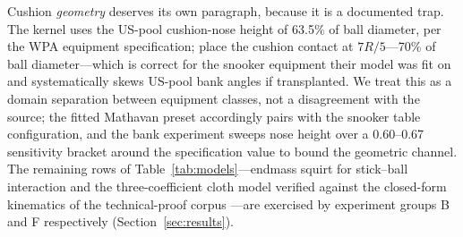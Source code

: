 Cushion \emph{geometry} deserves its own paragraph, because it is a
documented trap. The kernel uses the US-pool cushion-nose height of
63.5\% of ball diameter, per the WPA equipment specification;
\citet{mathavan2010cushion} place the cushion contact at $7R/5$---70\% of
ball diameter---which is correct for the snooker equipment their model was
fit on and systematically skews US-pool bank angles if transplanted. We
treat this as a domain separation between equipment classes, not a
disagreement with the source; the fitted Mathavan preset accordingly pairs
with the snooker table configuration, and the bank experiment sweeps nose
height over a 0.60--0.67 sensitivity bracket around the specification
value to bound the geometric channel. The remaining rows of
Table~\ref{tab:models}---endmass squirt for stick--ball interaction
\citep{cross2008squirt,alciatore_tp_a31,shepard2001squirt} and the
three-coefficient cloth model verified against the closed-form kinematics
of the technical-proof corpus \citep{alciatore_tp_catalog}---are exercised
by experiment groups B and F respectively (Section~\ref{sec:results}).


